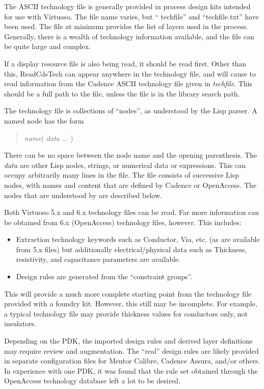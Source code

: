 The ASCII technology file is generally provided in process design kits
intended for use with Virtuoso.  The file name varies, but ``{\vt
techfile}'' and ``{\vt techfile.txt}'' have been used.  The file at
minimum provides the list of layers used in the process.  Generally,
there is a wealth of technology information available, and the file
can be quite large and complex.

If a display resource file is also being read, it should be read
first.  Other than this, {\vt ReadCdsTech} can appear anywhere in the
technology file, and will cause {\Xic} to read information from the
Cadence ASCII technology file given in {\it techfile}.  This should be
a full path to the file, unless the file is in the library search
path.

The technology file is collections of ``nodes'', as understood by the
Lisp parser.  A named node has the form
\begin{quote}
{\it name\/}{\vt (} {\it data} {\vt ... )}
\end{quote}
There can be no space between the node name and the opening
parenthesis.  The {\it data} are other Lisp nodes, strings, or
numerical data or expressions.  This can occupy arbitrarily many lines
in the file.  The file consists of successive Lisp nodes, with names
and content that are defined by Cadence or OpenAccess.  The nodes that
are understood by {\Xic} are described below.

Both Virtuoso 5.x and 6.x technology files can be read.  Far more
information can be obtained from 6.x (OpenAccess) technology files,
however.  This includes:

\begin{itemize}
\item{Extraction technology keywords such as {\vt Conductor}, {\vt
Via}, etc.  (as are available from 5.x files) but additionally
electrical/physical data such as {\vt Thickness}, resistivity, and
capacitance parameters are available.}

\item{Design rules are generated from the ``constraint groups''.}
\end{itemize}

This will provide a much more complete starting point from the
technology file provided with a foundry kit.  However, this still may
be incomplete.  For example, a typical technology file may provide
thickness values for conductors only, not insulators.

Depending on the PDK, the imported design rules and derived layer
definitions may require review and augmentation.  The ``real'' design
rules are likely provided in separate configuration files for Mentor
Calibre, Cadence Assura, and/or others.  In experience with one PDK,
it was found that the rule set obtained through the OpenAccess
technology database left a lot to be desired.

